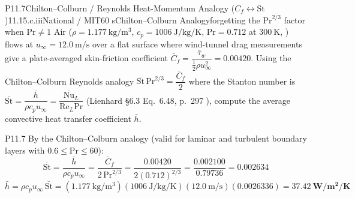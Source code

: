 \begin{problem}{P11.7}{Chilton--Colburn / Reynolds Heat-Momentum Analogy ($C_f \leftrightarrow \mathrm{St}$)}{11.1}{5.c.iii}{National / MIT}{60 s}{Chilton--Colburn Analogy}{forgetting the $\mathrm{Pr}^{2/3}$ factor when $\mathrm{Pr} \ne 1$}
Air ($\rho = \SI{1.177}{\kilogram\per\cubic\meter}$, $c_p = \SI{1006}{\joule\per\kilogram\per\kelvin}$, $\mathrm{Pr} = 0.712$ at $\SI{300}{\kelvin}$, ) flows at $u_\infty = \SI{12.0}{\meter\per\second}$ over a flat surface where wind-tunnel drag measurements give a plate-averaged skin-friction coefficient $\bar{C}_f = \dfrac{\bar{\tau}_w}{\frac{1}{2}\rho u_\infty^2} = 0.00420$. Using the Chilton--Colburn Reynolds analogy $\overline{\mathrm{St}}\,\mathrm{Pr}^{2/3} = \dfrac{\bar{C}_f}{2}$ where the Stanton number is $\overline{\mathrm{St}} = \dfrac{\bar{h}}{\rho c_p u_\infty} = \dfrac{\overline{\mathrm{Nu}}_L}{\mathrm{Re}_L \mathrm{Pr}}$ (Lienhard §6.3 Eq.~6.48, p.~297 ), compute the average convective heat transfer coefficient $\bar{h}$.
\end{problem}
\begin{solution}{P11.7}
By the Chilton--Colburn analogy (valid for laminar and turbulent boundary layers with $0.6 \le \mathrm{Pr} \le 60$):
\[
  \overline{\mathrm{St}} = \frac{\bar{h}}{\rho c_p u_\infty} = \frac{\bar{C}_f}{2\,\mathrm{Pr}^{2/3}} = \frac{0.00420}{2(0.712)^{2/3}} = \frac{0.002100}{0.79736} = \mathbf{0.002634}
\]
\[
  \bar{h} = \rho c_p u_\infty\,\overline{\mathrm{St}} = (\SI{1.177}{\kilogram\per\cubic\meter})(\SI{1006}{\joule\per\kilogram\per\kelvin})(\SI{12.0}{\meter\per\second})(0.0026336) = \mathbf{\SI{37.42}{\watt\per\square\meter\per\kelvin}}
\]
\end{solution}

